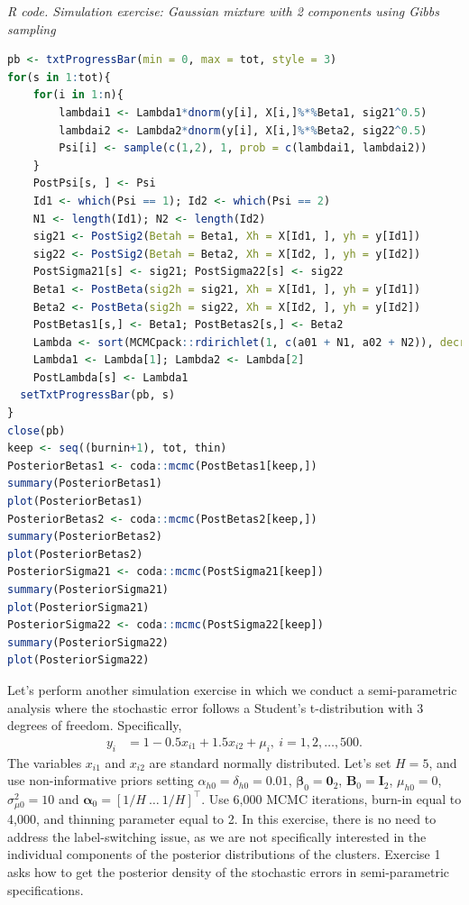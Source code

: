 \begin{tcolorbox}[enhanced,width=4.67in,center upper,
	fontupper=\large\bfseries,drop shadow southwest,sharp corners]
	\textit{R code. Simulation exercise: Gaussian mixture with 2 components using Gibbs sampling}
	\begin{VF}
		\begin{lstlisting}[language=R]
pb <- txtProgressBar(min = 0, max = tot, style = 3)
for(s in 1:tot){
	for(i in 1:n){
		lambdai1 <- Lambda1*dnorm(y[i], X[i,]%*%Beta1, sig21^0.5)
		lambdai2 <- Lambda2*dnorm(y[i], X[i,]%*%Beta2, sig22^0.5)
		Psi[i] <- sample(c(1,2), 1, prob = c(lambdai1, lambdai2))
	}
	PostPsi[s, ] <- Psi
	Id1 <- which(Psi == 1); Id2 <- which(Psi == 2)
	N1 <- length(Id1); N2 <- length(Id2)
	sig21 <- PostSig2(Betah = Beta1, Xh = X[Id1, ], yh = y[Id1])
	sig22 <- PostSig2(Betah = Beta2, Xh = X[Id2, ], yh = y[Id2])
	PostSigma21[s] <- sig21; PostSigma22[s] <- sig22
	Beta1 <- PostBeta(sig2h = sig21, Xh = X[Id1, ], yh = y[Id1])
	Beta2 <- PostBeta(sig2h = sig22, Xh = X[Id2, ], yh = y[Id2])
	PostBetas1[s,] <- Beta1; PostBetas2[s,] <- Beta2
	Lambda <- sort(MCMCpack::rdirichlet(1, c(a01 + N1, a02 + N2)), decreasing = TRUE)
	Lambda1 <- Lambda[1]; Lambda2 <- Lambda[2]
	PostLambda[s] <- Lambda1 
  setTxtProgressBar(pb, s)
}
close(pb)
keep <- seq((burnin+1), tot, thin)
PosteriorBetas1 <- coda::mcmc(PostBetas1[keep,])
summary(PosteriorBetas1)
plot(PosteriorBetas1)
PosteriorBetas2 <- coda::mcmc(PostBetas2[keep,])
summary(PosteriorBetas2)
plot(PosteriorBetas2)
PosteriorSigma21 <- coda::mcmc(PostSigma21[keep])
summary(PosteriorSigma21)
plot(PosteriorSigma21)
PosteriorSigma22 <- coda::mcmc(PostSigma22[keep])
summary(PosteriorSigma22)
plot(PosteriorSigma22)
\end{lstlisting}
	\end{VF}
\end{tcolorbox}

Let's perform another simulation exercise in which we conduct a semi-parametric analysis where the stochastic error follows a Student's t-distribution with 3 degrees of freedom. Specifically,  
\begin{align*}
	y_i &= 1 - 0.5x_{i1} + 1.5x_{i2} + \mu_i, \ i=1,2,\dots,500.
\end{align*}
The variables $x_{i1}$ and $x_{i2}$ are standard normally distributed. Let's set $H=5$, and use non-informative priors setting $\alpha_{h0}=\delta_{h0}=0.01$, $\boldsymbol{\beta}_0=\boldsymbol{0}_2$, $\boldsymbol{B}_0=\boldsymbol{I}_2$, $\mu_{h0}=0$, $\sigma^2_{\mu 0}=10$ and $\boldsymbol{\alpha}_0=[1/H \ \dots \ 1/H]^{\top}$. Use 6,000 MCMC iterations, burn-in equal to 4,000, and thinning parameter equal to 2. In this exercise, there is no need to address the label-switching issue, as we are not specifically interested in the individual components of the posterior distributions of the clusters. Exercise 1 asks how to get the posterior density of the stochastic errors in semi-parametric specifications. 

